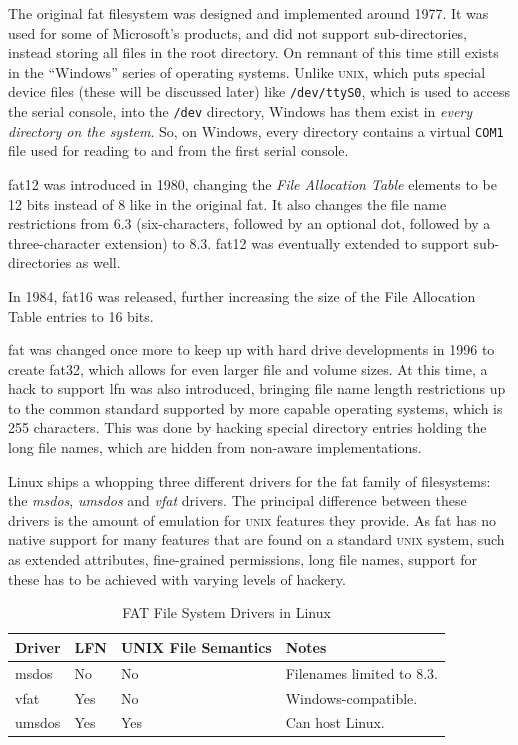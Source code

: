 \documentclass[a4paper]{article}
\begin{document}

The original \gls{fat} filesystem was designed and implemented around 1977. It was used for some of Microsoft's products, and did not support sub-directories, instead storing all files in the root directory. On remnant of this time still exists in the “Windows” series of operating systems. Unlike \textsc{unix}, which puts special device files (these will be discussed later) like \verb|/dev/ttyS0|, which is used to access the serial console, into the \verb|/dev| directory, Windows has them exist in \emph{every directory on the system}. So, on Windows, every directory contains a virtual \verb|COM1| file used for reading to and from the first serial console.

\gls{fat}12 was introduced in 1980, changing the \emph{File Allocation Table} elements to be 12 bits instead of 8 like in the original \gls{fat}. It also changes the file name restrictions from 6.3 (six-characters, followed by an optional dot, followed by a three-character extension) to 8.3. \gls{fat}12 was eventually extended to support sub-directories as well.

In 1984, \gls{fat}16 was released, further increasing the size of the File Allocation Table entries to 16 bits.

\gls{fat} was changed once more to keep up with hard drive developments in 1996 to create \gls{fat}32, which allows for even larger file and volume sizes. At this time, a hack to support \gls{lfn} was also introduced, bringing file name length restrictions up to the common standard supported by more capable operating systems, which is 255 characters. This was done by hacking special directory entries holding the long file names, which are hidden from non-aware implementations.

Linux ships a whopping three different drivers for the \gls{fat} family of filesystems: the \emph{msdos}, \emph{umsdos} and \emph{vfat} drivers. The principal difference between these drivers is the amount of emulation for \textsc{unix} features they provide. As \gls{fat} has no native support for many features that are found on a standard \textsc{unix} system, such as extended attributes, fine-grained permissions, long file names, support for these has to be achieved with varying levels of hackery.


\begin{table}
\centering\caption{FAT File System Drivers in Linux}\label{tbl:fathack}
\begin{tabular}{@{}llll@{}}
\toprule
Driver & LFN & UNIX File Semantics & Notes\\
\midrule
msdos & No & No & Filenames limited to 8.3.\\
vfat & Yes & No & Windows-compatible.\\
umsdos & Yes & Yes & Can host Linux.\\
\bottomrule
\end{tabular}  
\end{table}
\end{document}

